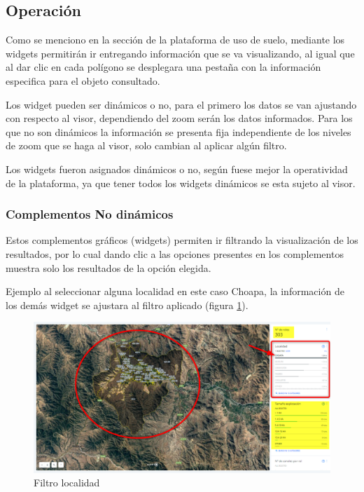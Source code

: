 \documentclass[10pt]{article}
\begin{document}
\subsection{Operación}

Como se menciono en la sección de la plataforma de uso de suelo, mediante los widgets permitirán ir entregando información que se va visualizando, al igual que al dar clic en cada polígono se desplegara una pestaña con la información especifica para el objeto consultado.

Los widget pueden ser dinámicos o no, para el primero los datos se van ajustando con respecto al visor, dependiendo del zoom serán los datos informados. Para los que no son dinámicos la información se presenta fija independiente de los niveles de zoom que se haga al visor, solo cambian al aplicar algún filtro.\setlength{\parindent}{0pt}

Los widgets fueron asignados dinámicos o no, según fuese mejor la operatividad de la plataforma, ya que tener todos los widgets dinámicos se esta sujeto al visor.  




\subsubsection{Complementos No dinámicos}

Estos complementos gráficos (widgets) permiten ir filtrando la visualización de los resultados, por lo cual dando clic a las opciones presentes en los complementos muestra solo los resultados de la opción elegida.\bigskip\setlength{\parindent}{0pt}

Ejemplo al seleccionar alguna localidad en este caso Choapa, la información de los demás widget se ajustara al filtro aplicado (figura \ref{13}).
\begin{figure}[H]
\centering
\includegraphics[scale=0.5]{Figuras_manual/filtro_localidades.png}
\caption{Filtro localidad}
\label{13}
\end{figure}
\end{document}
